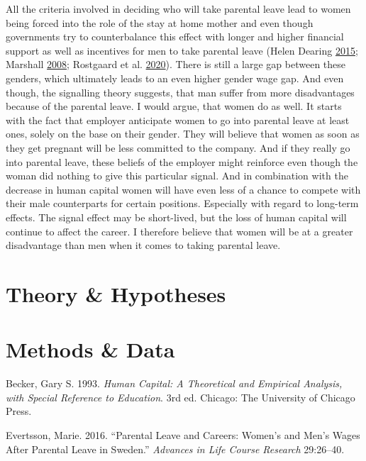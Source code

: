 \documentclass[
  12pt,
]{article}
\begin{document}
All the criteria involved in deciding who will take parental leave lead to women being forced into the role of the stay at home mother and even though governments try to counterbalance this effect with longer and higher financial support as well as incentives for men to take parental leave (Helen Dearing \protect\hyperlink{ref-helen_dearing_does_2015}{2015}; Marshall \protect\hyperlink{ref-marshall_fathers_2008}{2008}; Rostgaard et al. \protect\hyperlink{ref-rostgaard_parental_2020}{2020}). There is still a large gap between these genders, which ultimately leads to an even higher gender wage gap. And even though, the signalling theory suggests, that man suffer from more disadvantages because of the parental leave. I would argue, that women do as well. It starts with the fact that employer anticipate women to go into parental leave at least ones, solely on the base on their gender. They will believe that women as soon as they get pregnant will be less committed to the company. And if they really go into parental leave, these beliefs of the employer might reinforce even though the woman did nothing to give this particular signal. And in combination with the decrease in human capital women will have even less of a chance to compete with their male counterparts for certain positions. Especially with regard to long-term effects. The signal effect may be short-lived, but the loss of human capital will continue to affect the career. I therefore believe that women will be at a greater disadvantage than men when it comes to taking parental leave.

\hypertarget{theory-hypotheses}{%
\section{Theory \& Hypotheses}\label{theory-hypotheses}}

\hypertarget{methods-data}{%
\section*{Methods \& Data}\label{methods-data}}

\hypertarget{refs}{}
\leavevmode\hypertarget{ref-becker_human_1993}{}%
Becker, Gary S. 1993. \emph{Human Capital: A Theoretical and Empirical Analysis, with Special Reference to Education}. 3rd ed. Chicago: The University of Chicago Press.

\leavevmode\hypertarget{ref-evertsson_parental_2016}{}%
Evertsson, Marie. 2016. ``Parental Leave and Careers: Women's and Men's Wages After Parental Leave in Sweden.'' \emph{Advances in Life Course Research} 29:26--40.
\end{document}
